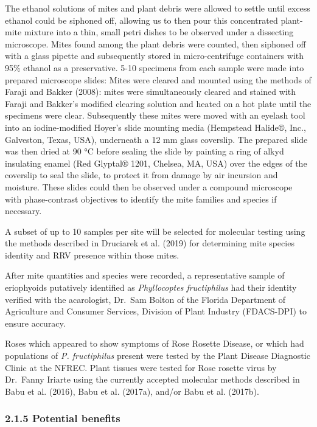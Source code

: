 \documentclass[12pt,final,CPage]{ufthesis}
\begin{document}
{  The ethanol solutions of mites and plant debris were allowed to settle until excess ethanol could be siphoned off, allowing us to then pour this concentrated plant-mite mixture into a thin, small petri dishes to be observed under a dissecting microscope. Mites found among the plant debris were counted, then siphoned off with a glass pipette and subsequently stored in micro-centrifuge containers with 95\% ethanol as a preservative. 5-10 specimens from each sample were made into prepared microscope slides: Mites were cleared and mounted using the methods of Faraji and Bakker (2008): mites were simultaneously cleared and stained with Faraji and Bakker's modified clearing solution and heated on a hot plate until the specimens were clear. Subsequently these mites were moved with an eyelash tool into an iodine-modified Hoyer's slide mounting media (Hempstead Halide®, Inc., Galveston, Texas, USA), underneath a 12 mm glass coverslip. The prepared slide was then dried at 90 °C before sealing the slide by painting a ring of alkyd insulating enamel (Red Glyptal® 1201, Chelsea, MA, USA) over the edges of the coverslip to seal the slide, to protect it from damage by air incursion and moisture. These slides could then be observed under a compound microscope with phase-contrast objectives to identify the mite families and species if necessary.

  A subset of up to 10 samples per site will be selected for molecular testing using the methods described in Druciarek et al. (2019) for determining mite species identity and RRV presence within those mites.

  After mite quantities and species were recorded, a representative sample of eriophyoids putatively identified as \emph{Phyllocoptes fructiphilus} had their identity verified with the acarologist, Dr.~Sam Bolton of the Florida Department of Agriculture and Consumer Services, Division of Plant Industry (FDACS-DPI) to ensure accuracy.

  Roses which appeared to show symptoms of Rose Rosette Disease, or which had populations of \emph{P. fructiphilus} present were tested by the Plant Disease Diagnostic Clinic at the NFREC. Plant tissues were tested for Rose rosette virus by Dr.~Fanny Iriarte using the currently accepted molecular methods described in Babu et al. (2016), Babu et al. (2017a), and/or Babu et al. (2017b).

  \hypertarget{potential-benefits}{%
  \subsubsection{2.1.5 Potential benefits}\label{potential-benefits}}

}
\end{document}
